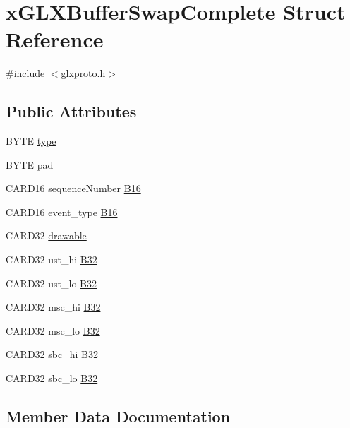 \hypertarget{structx_g_l_x_buffer_swap_complete}{}\section{x\+G\+L\+X\+Buffer\+Swap\+Complete Struct Reference}
\label{structx_g_l_x_buffer_swap_complete}


{\ttfamily \#include $<$glxproto.\+h$>$}

\subsection*{Public Attributes}
\begin{DoxyCompactItemize}
\item 
B\+Y\+TE \hyperlink{structx_g_l_x_buffer_swap_complete_aa4ed369a8b1124e8721a9ff7b8cda76c}{type}
\item 
B\+Y\+TE \hyperlink{structx_g_l_x_buffer_swap_complete_a8fa387dc2ae9cc1b3e0b85f4380a7a3d}{pad}
\item 
C\+A\+R\+D16 sequence\+Number \hyperlink{structx_g_l_x_buffer_swap_complete_a8eed11c7eaf06989244aaf8fabb51c5a}{B16}
\item 
C\+A\+R\+D16 event\+\_\+type \hyperlink{structx_g_l_x_buffer_swap_complete_ae8177e73e6b957be8f364d28951c8cfd}{B16}
\item 
C\+A\+R\+D32 \hyperlink{structx_g_l_x_buffer_swap_complete_a722f8833c713ae2ea48bce2bec84548e}{drawable}
\item 
C\+A\+R\+D32 ust\+\_\+hi \hyperlink{structx_g_l_x_buffer_swap_complete_ac8eeeb8c77f990dec53aadeb9a76f990}{B32}
\item 
C\+A\+R\+D32 ust\+\_\+lo \hyperlink{structx_g_l_x_buffer_swap_complete_a1ad28de83501d2ddd18d38c559d28786}{B32}
\item 
C\+A\+R\+D32 msc\+\_\+hi \hyperlink{structx_g_l_x_buffer_swap_complete_ab7b2189ee852d105f60f239a57aa80ce}{B32}
\item 
C\+A\+R\+D32 msc\+\_\+lo \hyperlink{structx_g_l_x_buffer_swap_complete_ad4855b42cdb52bc02a8384c8a57b7e55}{B32}
\item 
C\+A\+R\+D32 sbc\+\_\+hi \hyperlink{structx_g_l_x_buffer_swap_complete_a5e835f45d7993f8adebb4bf540f5439f}{B32}
\item 
C\+A\+R\+D32 sbc\+\_\+lo \hyperlink{structx_g_l_x_buffer_swap_complete_a3ae1474419e468979c52418ed7982a2e}{B32}
\end{DoxyCompactItemize}


\subsection{Member Data Documentation}
\mbox{\label{structx_g_l_x_buffer_swap_complete_a8eed11c7eaf06989244aaf8fabb51c5a}} 
